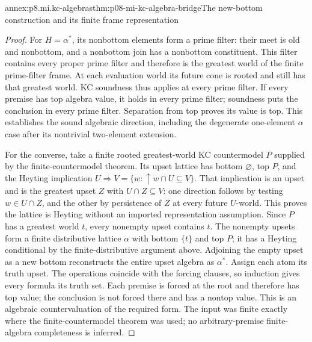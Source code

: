 \begin{annexitem}{annex:p8.mi.kc-algebras}{thm:p08-mi-kc-algebra-bridge}{The new-bottom construction and its finite frame representation}
\begin{proof}
For \(H=\alpha^*\), its nonbottom elements form a prime filter:
their meet is old and nonbottom, and a nonbottom join has a nonbottom
constituent. This filter contains every proper prime filter and
therefore is the greatest world of the finite prime-filter frame.
At each evaluation world its future cone is rooted and still has
that greatest world. KC soundness thus applies at every prime filter.
If every premise has top algebra value, it holds in every prime
filter; soundness puts the conclusion in every prime filter.
Separation from top proves its value is top. This establishes the
sound algebraic direction, including the degenerate one-element
\(\alpha\) case after its nontrivial two-element extension.

For the converse, take a finite rooted greatest-world KC countermodel
\(P\) supplied by the finite-countermodel theorem. Its upset lattice
has bottom \(\varnothing\), top \(P\), and the Heyting implication
\(U\Rightarrow V=\{w:\uparrow w\cap U\subseteq V\}\).
That implication is an upset and is the greatest upset \(Z\) with
\(U\cap Z\subseteq V\): one direction follows by testing
\(w\in U\cap Z\), and the other by persistence of \(Z\)
at every future \(U\)-world. This proves the lattice is Heyting
without an imported representation assumption. Since \(P\) has a
greatest world \(t\), every nonempty upset contains \(t\).
The nonempty upsets form a finite distributive lattice \(\alpha\)
with bottom \(\{t\}\) and top \(P\); it has a Heyting conditional
by the finite-distributive argument above. Adjoining the empty upset
as a new bottom reconstructs the entire upset algebra as \(\alpha^*\).
Assign each atom its truth upset. The operations coincide with the
forcing clauses, so induction gives every formula its truth set.
Each premise is forced at the root and therefore has top value;
the conclusion is not forced there and has a nontop value.
This is an algebraic countervaluation of the required form.
The input was finite exactly where the finite-countermodel theorem
was used; no arbitrary-premise finite-algebra completeness is inferred.
\end{proof}
\end{annexitem}


